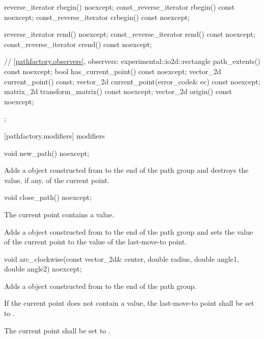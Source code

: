 \begin{codeblock}
{{{{{    
    reverse_iterator rbegin() noexcept;
    const_reverse_iterator rbegin() const noexcept;
    const_reverse_iterator crbegin() const noexcept;

    reverse_iterator rend() noexcept;
    const_reverse_iterator rend() const noexcept;
    const_reverse_iterator crend() const noexcept;

    
    // \ref{pathfactory.observers}, observers:
    experimental::io2d::rectangle path_extents() const noexcept;
    bool has_current_point() const noexcept;
    vector_2d current_point() const;
    vector_2d current_point(error_code& ec) const noexcept;
    matrix_2d transform_matrix() const noexcept;
    vector_2d origin() const noexcept;
  };
} } } }
\end{codeblock}

 [pathfactory.modifiers] { modifiers}

\begin{itemdecl}
    void new_path() noexcept;
\end{itemdecl}
\begin{itemdescr}
	\pnum
	\effects
	Adds a  object constructed from  to the end of the path group and destroys the value, if any, of the current point.
\end{itemdescr}

\begin{itemdecl}
    void close_path() noexcept;
\end{itemdecl}
\begin{itemdescr}
	\pnum
	\requires
	The current point contains a value.
	
	\pnum
	\effects
	Adds a  object constructed from  to the end of the path group and sets the value of the current point to the value of the last-move-to point.
\end{itemdescr}

\begin{itemdecl}
    void arc_clockwise(const vector_2d& center, double radius, double angle1,
      double angle2) noexcept;
\end{itemdecl}
\begin{itemdescr}
	\pnum
	\effects
	Adds a  object constructed from  to the end of the path group.
	
	\pnum
	If the current point does not contain a value, the last-move-to point shall be set to .
	
	\pnum
	The current point shall be set to .
\end{itemdescr}

